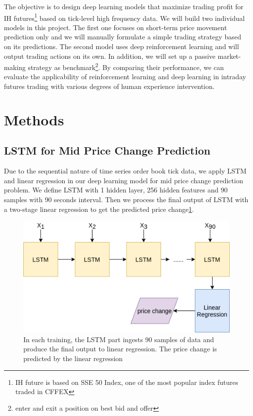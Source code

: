 \documentclass{article}
\begin{document}
The objective is to design deep learning models that maximize trading profit for IH futures\footnote{IH future is based on SSE 50 Index, one of the most popular index futures traded in CFFEX} based on tick-level high frequency data. We will build two individual models in this project. The first one focuses on short-term price movement prediction only and we will manually formulate a simple trading strategy based on its predictions. The second model uses deep reinforcement learning and will output trading actions on its own. In addition, we will set up a passive market-making strategy as benchmark\footnote{enter and exit a position on best bid and offer}. By comparing their performance, we can evaluate the applicability of reinforcement learning and deep learning in intraday futures trading with various degrees of human experience intervention.

\section{Methods}

\subsection{LSTM for Mid Price Change Prediction}

Due to the sequential nature of time series order book tick data, we apply LSTM and linear regression in our deep learning model for mid price change prediction problem. We define LSTM with 1 hidden layer, 256 hidden features and 90 samples with 90 seconds interval. Then we process the final output of LSTM with a two-stage linear regression to get the predicted price change\ref{fig:lstm}.

\begin{figure}[h]
	\includegraphics[width=\linewidth]{lstm.png}
	\caption{In each training, the LSTM part ingests 90 samples of data and produce the final output to linear regression. The price change is predicted by the linear regression}
	\label{fig:lstm}
\end{figure}
\end{document}
